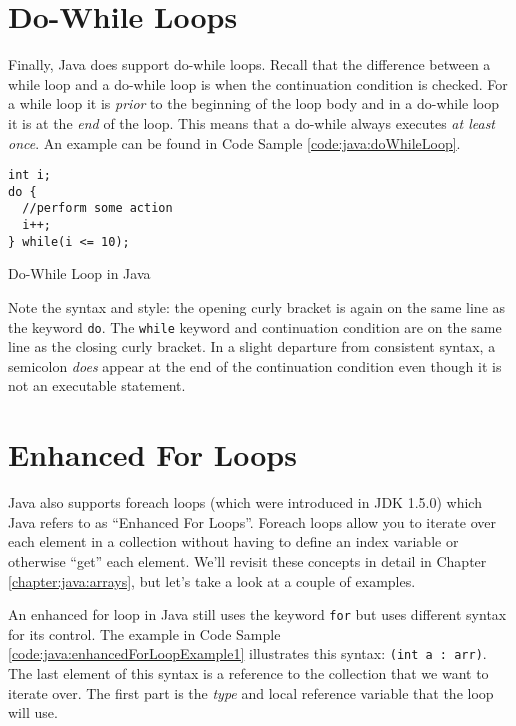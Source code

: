 \section{Do-While Loops}

Finally, Java does support do-while loops.  Recall that the difference between a
while loop and a do-while loop is when the continuation condition is checked.
For a while loop it is \emph{prior} to the beginning of the loop body and in
a do-while loop it is at the \emph{end} of the loop.  This means that a do-while 
always executes \emph{at least once}.  An example can be found in Code
Sample \ref{code:java:doWhileLoop}.

\begin{listing}
\begin{verbatim}
int i;
do {
  //perform some action
  i++;
} while(i <= 10);
\end{verbatim}
  \caption{Do-While Loop in Java}
  \label{code:java:doWhileLoop}
\end{listing}

Note the syntax and style: the opening curly bracket is again on the same
line as the keyword \texttt{do}.  The \texttt{while} keyword and
continuation condition are on the same line as the closing curly bracket.
In a slight departure from consistent syntax, a semicolon \emph{does} appear
at the end of the continuation condition even though it is not an
executable statement.

\section{Enhanced For Loops}

Java also supports foreach loops (which were introduced in JDK 1.5.0) which
Java refers to as ``Enhanced For Loops''.  Foreach loops allow you to 
iterate over each element in a collection without having to define an index
variable or otherwise ``get'' each element.  We'll revisit these concepts
in detail in Chapter \ref{chapter:java:arrays}, but let's take a look 
at a couple of examples.

An enhanced for loop in Java still uses the keyword \texttt{for} 
but uses different syntax for its control.  The example in Code Sample 
\ref{code:java:enhancedForLoopExample1} illustrates this syntax:
\texttt{(int a : arr)}.  The last element of this syntax is
a reference to the collection that we want to iterate over.  The first
part is the \emph{type} and local reference variable that the loop
will use.  

